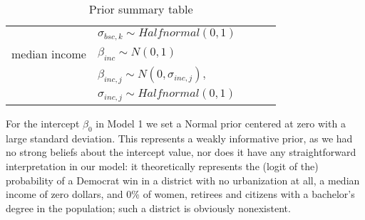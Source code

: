 \documentclass[12pt]{article}
\begin{document}
\begin{table}[h]
{\begin{tabular}{l|llll}
			              & $\sigma_{bsc,k} \sim Halfnormal(0,1)$        &                                              &                                          &                                          \\
			median income & $\beta_{inc} \sim N(0,1)$                    &                                              &                                          &                                          \\
			              & $\beta_{inc, j} \sim N(0, \sigma_{inc,j}), $ &                                              &                                          &                                          \\
			              & $\sigma_{inc,j} \sim Halfnormal(0,1)$        &                                              &                                          &                                          \\ \bottomrule
		\end{tabular}%
		}
		\caption{Prior summary table}
		\label{tab:priors}
\end{table}




%
%
%
%
%
%
%





For the intercept $\beta_0$ in Model 1 we set a Normal prior centered at zero with a large standard deviation. 
This represents a weakly informative prior, as we had no strong beliefs about the intercept value, nor does it have any straightforward interpretation in our model: it theoretically represents the (logit of the) probability of a Democrat win in a district with no urbanization at all, a median income of zero dollars, and 0\% of women, retirees and citizens with a bachelor's degree in the population; such a district is obviously nonexistent.
\end{document}
